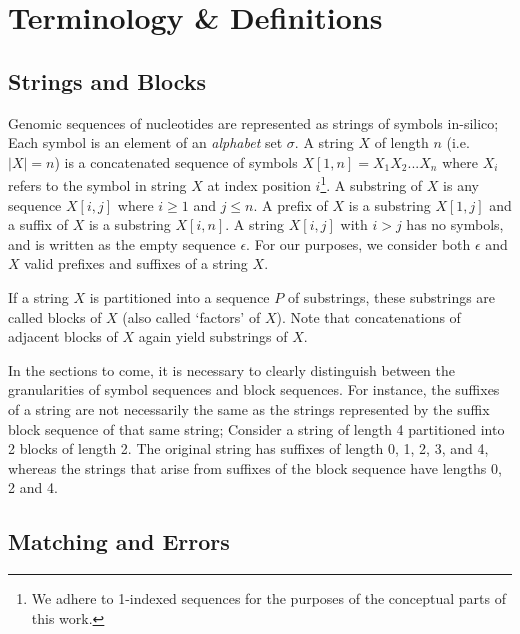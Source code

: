 \chapter{Terminology \& Definitions}

\section{Strings and Blocks}

Genomic sequences of nucleotides are represented as strings of symbols in-silico; Each symbol is an element of an \textit{alphabet} set $\sigma{}$. A string $X$ of length $n$ (i.e. $|X|=n$) is a concatenated sequence of symbols $X[1,n] = X_1X_2...X_n$ where $X_i$ refers to the symbol in string $X$ at index position $i$\footnote{We adhere to 1-indexed sequences for the purposes of the conceptual parts of this work.}. A substring of $X$ is any sequence $X[i,j]$ where $i \geq 1$ and $j \leq n$. A prefix of $X$ is a substring $X[1,j]$ and a suffix of $X$ is a substring $X[i,n]$. A string $X[i,j]$ with $i > j$ has no symbols, and is written as the empty sequence $\epsilon$. For our purposes, we consider both $\epsilon$ and $X$ valid prefixes and suffixes of a string $X$.
 
If a string $X$ is partitioned into a sequence $P$ of substrings, these substrings are called \glspl{block} of $X$ (also called `factors' of $X$). Note that concatenations of adjacent blocks of $X$ again yield substrings of $X$.

In the sections to come, it is necessary to clearly distinguish between the granularities of symbol sequences and \glspl{block sequence}. For instance, the suffixes of a string are not necessarily the same as the strings represented by the \gls{suffix block sequence} of that same string; Consider a string of length 4 partitioned into 2 blocks of length 2. The original string has suffixes of length 0, 1, 2, 3, and 4, whereas the strings that arise from suffixes of the block sequence have lengths 0, 2 and 4.

\section{Matching and Errors}

